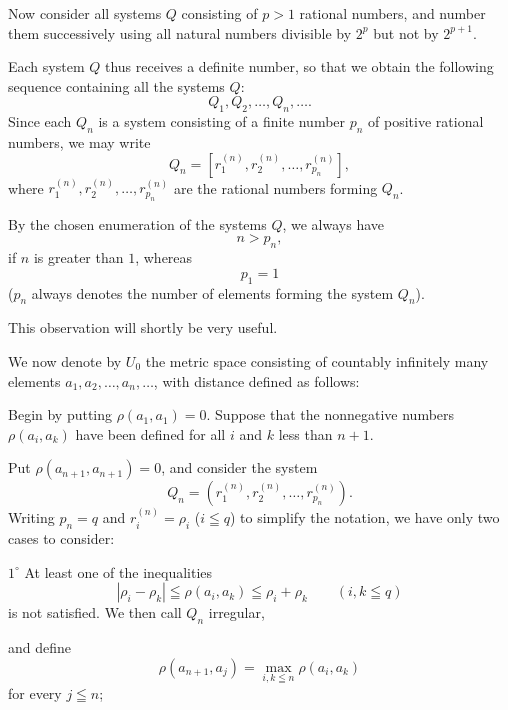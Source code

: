 \documentclass[a4paper,12pt]{amsart}
\newcommand{\srcpage}[1]{} %
\begin{document}
Now consider all systems $Q$ consisting of $p>1$ rational numbers, and number them successively using all natural numbers divisible by $2^p$ but not by $2^{p+1}$.

Each system $Q$ thus receives a definite number, so that we obtain the following sequence containing all the systems $Q$:
\begin{equation}\tag{3}
Q_1,Q_2,\dots,Q_n,\dots.
\end{equation}
Since each $Q_n$ is a system consisting of a finite number $p_n$ of positive rational numbers, we may write
\begin{equation}\tag{4}
Q_n=[r_1^{(n)},r_2^{(n)},\dots,r_{p_n}^{(n)}],
\end{equation}
where $r_1^{(n)},r_2^{(n)},\dots,r_{p_n}^{(n)}$ are the rational numbers forming $Q_n$.

By the chosen enumeration of the systems $Q$, we always have
\begin{equation}\tag{5}
n>p_n,
\end{equation}
if $n$ is greater than $1$, whereas
\begin{equation}\tag{$5_1$}
p_1=1
\end{equation}
($p_n$ always denotes the number of elements forming the system $Q_n$).

This observation will shortly be very useful.

We now denote by $U_0$ the metric space consisting of countably infinitely many elements $a_1,a_2,\dots,a_n,\dots$, with distance defined as follows:

Begin by putting $\rho(a_1,a_1)=0$. Suppose that the nonnegative numbers $\rho(a_i,a_k)$ have been defined for all $i$ and $k$ less than $n+1$.

Put $\rho(a_{n+1},a_{n+1})=0$, and consider the system
\begin{equation}\tag{4}
Q_n=(r_1^{(n)},r_2^{(n)},\dots,r_{p_n}^{(n)}).
\end{equation}
Writing $p_n=q$ and $r_i^{(n)}=\rho_i$ ($i\leqq q$) to simplify the notation, we have only two cases to consider:

$1^\circ$ At least one of the inequalities
\begin{equation}\tag{$\Delta$}
|\rho_i-\rho_k|\leqq\rho(a_i,a_k)\leqq\rho_i+\rho_k
\qquad(i,k\leqq q)
\end{equation}
is not satisfied. We then call $Q_n$ irregular,
\srcpage{54}
and define
\begin{equation}\tag{6}
\rho(a_{n+1},a_j)=\max_{i,k\leqq n}\rho(a_i,a_k)
\end{equation}
for every $j\leqq n$;
\end{document}
